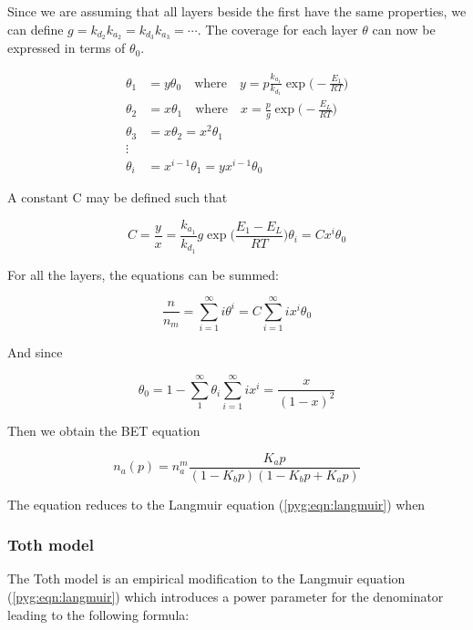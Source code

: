 Since we are assuming that all layers beside the first have the same
properties,
we can define \(g= {k_{d_2}}{k_{a_2}} = {k_{d_3}}{k_{a_3}} =
\cdots\).
The coverage for each layer \(\theta\) can now be expressed in terms
of \(\theta_0\).

\begin{align}
	\theta_1 & = y \theta_0 \quad \text{where} \quad y = p
	\frac{k_{a_1}}{k_{d_1}} \exp{\Big(-\frac{E_1}{RT}\Big)} \\
	\theta_2 & = x \theta_1 \quad \text{where} \quad x =
	\frac{p}{g} \exp{\Big(-\frac{E_L}{RT}\Big)}             \\
	\theta_3 & = x \theta_2 = x^2 \theta_1
	\\
	\vdots \nonumber
	\\
	\theta_i & = x^{i-1} \theta_1 = y x^{i-1} \theta_0
\end{align}

A constant C may be defined such that

\begin{equation}
	C = \frac{y}{x} = \frac{k_{a_1}}{k_{d_1}} g
	\exp{\Big(\frac{E_1 - E_L}{RT}\Big)}
	\theta_i = C x^i \theta_0
\end{equation}

For all the layers, the equations can be summed:

\begin{equation}
	\frac{n}{n_m} = \sum_{i=1}^{\infty} i \theta^i = C
	\sum_{i=1}^{\infty} i x^i \theta_0
\end{equation}

And since

\begin{equation}
	\theta_0 = 1 - \sum_{1}^{\infty} \theta_i
	\sum_{i=1}^{\infty} i x^i = \frac{x}{(1-x)^2}
\end{equation}

Then we obtain the BET equation 

\begin{equation}\label{pyg:eqn:bet}
	n_a(p) = n_a^m \frac{K_a p}{(1-K_b p)(1-K_b p+ K_a p)}
\end{equation}

The equation reduces to the Langmuir equation
(\ref{pyg:eqn:langmuir}) when

\subsubsection{Toth model}\label{pyg:models:toth}

The Toth model is an empirical modification to the Langmuir equation
(\ref{pyg:eqn:langmuir})
which introduces a power parameter for the denominator leading to
the following formula:

